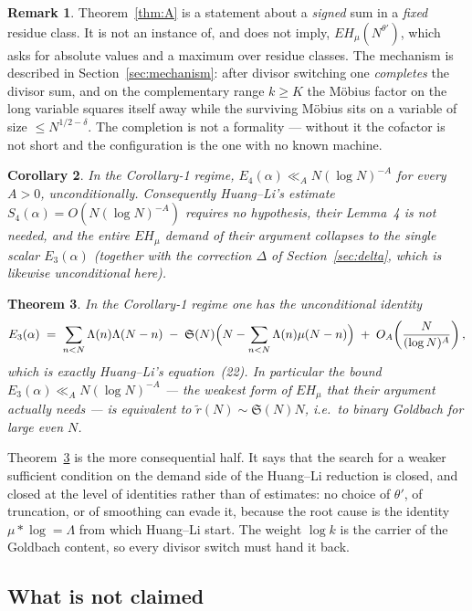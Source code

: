 \documentclass[11pt,a4paper]{article}
\theoremstyle{plain}
\newtheorem{theorem}{Theorem}
\newtheorem{corollary}[theorem]{Corollary}
\theoremstyle{definition}
\newtheorem{remark}[theorem]{Remark}
\renewcommand{\SS}{\mathfrak{S}}
\begin{document}
\begin{remark}
Theorem~\ref{thm:A} is a statement about a \emph{signed} sum in a
\emph{fixed} residue class. It is not an instance of, and does not
imply, $EH_\mu(N^{\theta'})$, which asks for absolute values and a
maximum over residue classes. The mechanism is described in
Section~\ref{sec:mechanism}: after divisor switching one \emph{completes}
the divisor sum, and on the complementary range $k\ge K$ the M\"obius
factor on the long variable squares itself away while the surviving
M\"obius sits on a variable of size $\le N^{1/2-\delta}$. The completion
is not a formality --- without it the cofactor is not short and the
configuration is the one with no known machine.
\end{remark}

\begin{corollary}\label{cor:B}
In the Corollary-1 regime, $E_4(\alpha)\ll_A N(\log N)^{-A}$ for every
$A>0$, unconditionally. Consequently Huang--Li's estimate
$S_4(\alpha)=O(N(\log N)^{-A})$ requires no hypothesis, their Lemma~4 is
not needed, and the entire $EH_\mu$ demand of their argument collapses
to the single scalar $E_3(\alpha)$ (together with the correction
$\Delta$ of Section~\ref{sec:delta}, which is likewise unconditional
here).
\end{corollary}

\begin{theorem}\label{thm:C}
In the Corollary-1 regime one has the unconditional identity
\[
  E_3(\alpha) \;=\; \sum_{n<N}\Lambda(n)\Lambda(N-n)
     \;-\; \SS(N)\Bigl(N-\sum_{n<N}\Lambda(n)\mu(N-n)\Bigr)
     \;+\; O_A\!\left(\frac{N}{(\log N)^{A}}\right),
\]
which is exactly Huang--Li's equation~(22). In particular the bound
$E_3(\alpha)\ll_A N(\log N)^{-A}$ --- the weakest form of $EH_\mu$ that
their argument actually needs --- is \emph{equivalent} to
$\tilde r(N)\sim\SS(N)N$, i.e.\ to binary Goldbach for large even $N$.
\end{theorem}

Theorem~\ref{thm:C} is the more consequential half. It says that the
search for a weaker sufficient condition on the demand side of the
Huang--Li reduction is closed, and closed at the level of identities
rather than of estimates: no choice of $\theta'$, of truncation, or of
smoothing can evade it, because the root cause is the identity
$\mu*\log=\Lambda$ from which Huang--Li start. The weight $\log k$ is
the carrier of the Goldbach content, so every divisor switch must hand
it back.

\subsection{What is not claimed}\label{sec:notclaimed}
\end{document}
